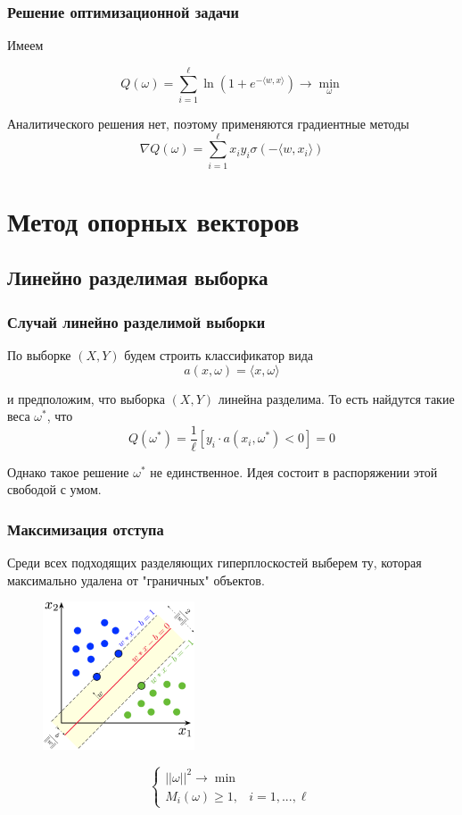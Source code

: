 \documentclass{beamer}
\begin{document}
	\begin{frame}
		\frametitle{Решение оптимизационной задачи}
		Имеем
		
		\[
		Q(\omega) = \sum_{i=1}^{\ell} \ln (1 + e^{-\langle w, x \rangle}) \rightarrow \min_{\omega}
		\]
		
		Аналитического решения нет, поэтому применяются градиентные методы
		\[
		\nabla Q(\omega) = \sum_{i=1}^{\ell} x_i y_i \sigma(- \langle w, x_i \rangle)
		\]
	\end{frame}
	
	\section{Метод опорных векторов}
	
	\subsection{Линейно разделимая выборка}
	
	\begin{frame}
		\frametitle{Случай линейно разделимой выборки}
		
		По выборке $(X, Y)$ будем строить классификатор вида
		\[
		a(x, \omega) = \langle x, \omega \rangle
		\]
		
		и предположим, что выборка $(X, Y)$ линейна разделима. То есть найдутся такие веса $\omega^{*}$, что 
		\[
		Q(\omega^{*}) = \frac{1}{\ell} [y_i \cdot a(x_i, \omega^{*}) < 0] = 0
		\]
		
		Однако такое решение $\omega^{*}$ не единственное. Идея состоит в распоряжении этой свободой с умом.
	\end{frame}
	
	\begin{frame}
		\frametitle{Максимизация отступа}
		Среди всех подходящих разделяющих гиперплоскостей выберем ту, которая максимально удалена от "граничных" объектов.
		
		\vspace{5pt}
		
		\begin{figure}
			\centering
			\includegraphics[width=0.4\textwidth]{img/svm.png}
		\end{figure}
		
		\[
		\begin{cases}
			||\omega||^2 \rightarrow \min \\
			M_i(\omega) \ge 1, &  i=1, ..., \ell
		\end{cases}
		\]
	\end{frame}
	
\end{document}
